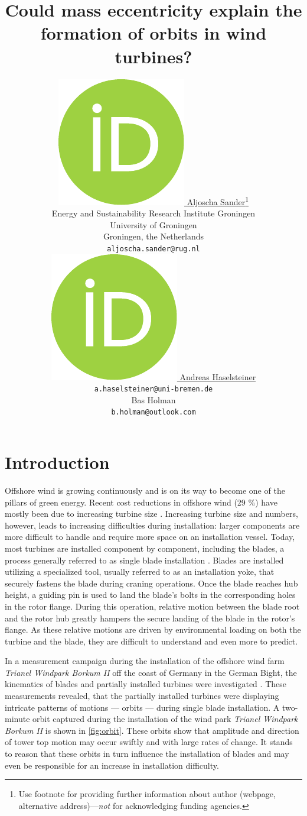 \documentclass{article}
\title{Could mass eccentricity explain the formation of orbits in wind turbines?}
\author{ \href{https://orcid.org/0000-0000-0000-0000}{\includegraphics[scale=0.06]{orcid.pdf}\hspace{1mm} Aljoscha Sander}\thanks{Use footnote for providing further information about author (webpage, alternative address)---\emph{not} for acknowledging funding agencies.} \\
	Energy and Sustainability Research Institute Groningen\\
	University of Groningen\\
	Groningen, the Netherlands \\
	\texttt{aljoscha.sander@rug.nl} \\
	\And
	\href{https://orcid.org/0000-0000-0000-0000}{\includegraphics[scale=0.06]{orcid.pdf}\hspace{1mm} Andreas Haselsteiner} \\
	\texttt{a.haselsteiner@uni-bremen.de} \\
	\And
	Bas Holman \\
	\texttt{b.holman@outlook.com}\\
}
\begin{document}
\maketitle

\begin{abstract}
\end{abstract}




\section{Introduction}
\label{sec:introduction}

Offshore wind is growing continuously and is on its way to become one of the pillars of green energy. Recent cost reductions in offshore wind (29 \%) have mostly been due to increasing turbine size \citep{irenaRenewablePowerGeneration2020}. Increasing turbine size and numbers, however, leads to increasing difficulties during installation: larger components are more difficult to handle and require more space on an installation vessel. Today, most turbines are installed component by component, including the blades, a process generally referred to as single blade installation \citep{jiangInstallationOffshoreWind2021}. Blades are installed utilizing a specialized tool, usually referred to as an installation yoke, that securely fastens the blade during craning operations. Once the blade reaches hub height, a guiding pin is used to land the blade's bolts in the corresponding holes in the rotor flange. During this operation, relative motion between the blade root and the rotor hub greatly hampers the secure landing of the blade in the rotor's flange. As these relative motions are driven by environmental loading on both the turbine and the blade, they are difficult to understand and even more to predict. 

In a measurement campaign during the installation of the offshore wind farm \textit{Trianel Windpark Borkum II} off the coast of Germany in the German Bight, the kinematics of blades and partially installed turbines were investigated \citep{sanderRelativeMotionSingle2020,  sanderMONITORINGOFFSHOREWIND2020, sanderOscillationsOffshoreWind2020}. These measurements revealed, that the partially installed turbines were displaying intricate patterns of motions — orbits — during single blade installation. A two-minute orbit captured during the installation of the wind park \textit{Trianel Windpark Borkum II} is shown in \autoref{fig:orbit}. These orbits show that amplitude and direction of tower top motion may occur swiftly and with large rates of change. It stands to reason that these orbits in turn influence the installation of blades and may even be responsible for an increase in installation difficulty.
\end{document}
